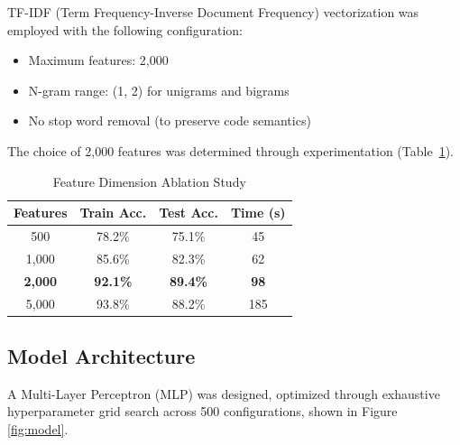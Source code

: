 \documentclass[conference]{IEEEtran}
\begin{document}
TF-IDF (Term Frequency-Inverse Document Frequency) vectorization was employed with the following configuration:

\begin{itemize}
    \item Maximum features: 2,000
    \item N-gram range: (1, 2) for unigrams and bigrams
    \item No stop word removal (to preserve code semantics)
\end{itemize}

The choice of 2,000 features was determined through experimentation (Table~\ref{tab:features}).

\begin{table}[h]
\centering
\caption{Feature Dimension Ablation Study}
\label{tab:features}
\begin{tabular}{@{}cccc@{}}
\toprule
\textbf{Features} & \textbf{Train Acc.} & \textbf{Test Acc.} & \textbf{Time (s)} \\ \midrule
500 & 78.2\% & 75.1\% & 45 \\
1,000 & 85.6\% & 82.3\% & 62 \\
\textbf{2,000} & \textbf{92.1\%} & \textbf{89.4\%} & \textbf{98} \\
5,000 & 93.8\% & 88.2\% & 185 \\ \bottomrule
\end{tabular}
\end{table}

\subsection{Model Architecture}

A Multi-Layer Perceptron (MLP) was designed, optimized through exhaustive hyperparameter grid search across 500 configurations, shown in Figure \ref{fig:model}.
\end{document}
